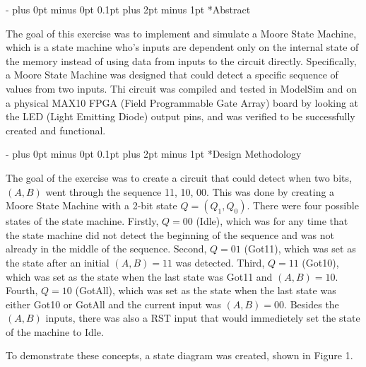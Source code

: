 \documentclass[\FontSize\FontUnit,letterpaper,oneside]{article}
\makeatletter
\renewcommand \section{
    \@startsection{section}{1}{\z@}
      {\dimexpr \FontSize\FontUnit * 2 - \parskip \relax plus 0pt minus 0pt}
      {0.1pt plus 2pt minus 1pt} %
      {\normalfont\normalsize\bfseries}}
\makeatother
\begin{document}
\graphicspath{{./images/}}

\section*{Abstract}
\par The goal of this exercise was to implement and simulate a
Moore State Machine, which is a state machine who's inputs are
dependent only on the internal state of the memory instead of
using data from inputs to the circuit directly. Specifically,
a Moore State Machine was designed that could detect a specific sequence
of values from two inputs. Thi circuit was compiled and tested in ModelSim and on a physical 
MAX10 FPGA (Field Programmable Gate Array)
board by looking at the LED (Light Emitting Diode) output pins, and was
verified to be successfully created and functional.

\section*{Design Methodology}
\par The goal of the exercise was to create a circuit that could detect when two
bits, $(A,B)$ went through the sequence 11, 10, 00. This was done by creating a Moore State Machine
with a 2-bit state $Q=(Q_1,Q_0)$. There were four possible states of the state machine. Firstly, $Q=00$ (Idle), which was for any time
that the state machine did not detect the beginning of the sequence and was not already in the middle of the
sequence. Second, $Q=01$ (Got11), which was set as the state after an initial $(A,B)=11$ was detected. Third,
$Q=11$ (Got10), which was set as the state when the last state was Got11 and $(A,B)=10$. Fourth, $Q=10$ (GotAll), which
was set as the state when the last state was either Got10 or GotAll and the current input was $(A,B)=00$. Besides the
$(A,B)$ inputs, there was also a RST input that would immedietely set the state of the machine to Idle.

To demonstrate these concepts, a state diagram was created, shown in Figure 1.
\end{document}
